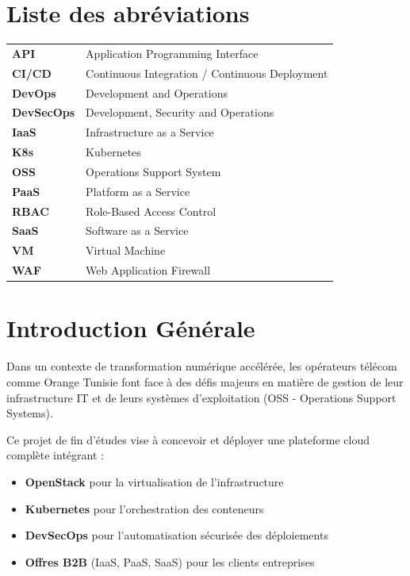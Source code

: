 \documentclass[12pt,a4paper,twoside]{report}
\begin{document}
\listoftables
{}
\newpage

\chapter*{Liste des abréviations}

\begin{tabular}{ll}
    \textbf{API} & Application Programming Interface \\
    \textbf{CI/CD} & Continuous Integration / Continuous Deployment \\
    \textbf{DevOps} & Development and Operations \\
    \textbf{DevSecOps} & Development, Security and Operations \\
    \textbf{IaaS} & Infrastructure as a Service \\
    \textbf{K8s} & Kubernetes \\
    \textbf{OSS} & Operations Support System \\
    \textbf{PaaS} & Platform as a Service \\
    \textbf{RBAC} & Role-Based Access Control \\
    \textbf{SaaS} & Software as a Service \\
    \textbf{VM} & Virtual Machine \\
    \textbf{WAF} & Web Application Firewall \\
\end{tabular}

\newpage


\chapter*{Introduction Générale}

Dans un contexte de transformation numérique accélérée, les opérateurs télécom comme Orange Tunisie font face à des défis majeurs en matière de gestion de leur infrastructure IT et de leurs systèmes d'exploitation (OSS - Operations Support Systems).

Ce projet de fin d'études vise à concevoir et déployer une plateforme cloud complète intégrant :
\begin{itemize}
    \item \textbf{OpenStack} pour la virtualisation de l'infrastructure
    \item \textbf{Kubernetes} pour l'orchestration des conteneurs
    \item \textbf{DevSecOps} pour l'automatisation sécurisée des déploiements
    \item \textbf{Offres B2B} (IaaS, PaaS, SaaS) pour les clients entreprises
\end{itemize}
\end{document}
